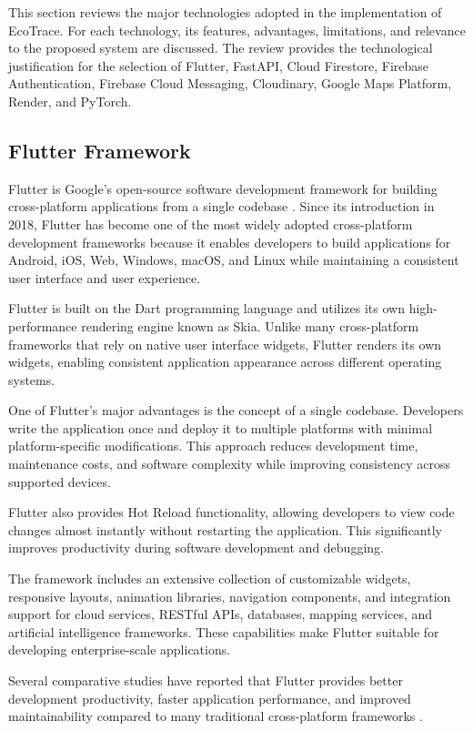 This section reviews the major technologies adopted in the implementation of
EcoTrace. For each technology, its features, advantages, limitations, and relevance
to the proposed system are discussed. The review provides the technological
justification for the selection of Flutter, FastAPI, Cloud Firestore, Firebase
Authentication, Firebase Cloud Messaging, Cloudinary, Google Maps Platform,
Render, and PyTorch.

\subsection{Flutter Framework}

Flutter is Google's open-source software development framework for building
cross-platform applications from a single codebase \citep{google2025flutter}. Since
its introduction in 2018, Flutter has become one of the most widely adopted
cross-platform development frameworks because it enables developers to build
applications for Android, iOS, Web, Windows, macOS, and Linux while
maintaining a consistent user interface and user experience.

Flutter is built on the Dart programming language and utilizes its own
high-performance rendering engine known as Skia. Unlike many cross-platform
frameworks that rely on native user interface widgets, Flutter renders its own
widgets, enabling consistent application appearance across different operating
systems.

One of Flutter's major advantages is the concept of a single codebase.
Developers write the application once and deploy it to multiple platforms with
minimal platform-specific modifications. This approach reduces development time,
maintenance costs, and software complexity while improving consistency across
supported devices.

Flutter also provides Hot Reload functionality, allowing developers to view code
changes almost instantly without restarting the application. This significantly
improves productivity during software development and debugging.

The framework includes an extensive collection of customizable widgets,
responsive layouts, animation libraries, navigation components, and integration
support for cloud services, RESTful APIs, databases, mapping services, and
artificial intelligence frameworks. These capabilities make Flutter suitable for
developing enterprise-scale applications.

Several comparative studies have reported that Flutter provides better
development productivity, faster application performance, and improved
maintainability compared to many traditional cross-platform frameworks
\citep{biswas2023}.

